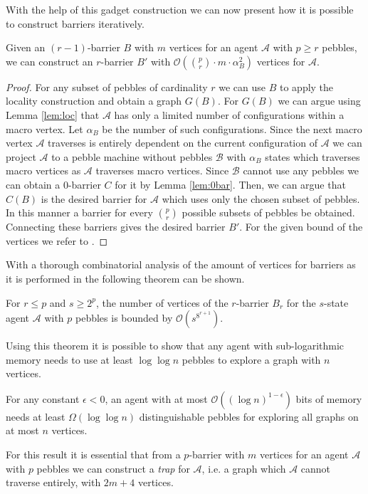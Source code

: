 With the help of this gadget construction we can now present how it is possible
to construct barriers iteratively.
\begin{thm}
  Given an $(r-1)$-barrier $B$ with $m$ vertices for an agent $\mathcal{A}$
  with $p\geq r$ pebbles, we can construct an $r$-barrier $B'$ with
  $\mathcal{O}({{p}\choose{r}}\cdot m\cdot \alpha_{B}^{2})$ vertices for
  $\mathcal{A}$.
\end{thm}
\begin{proof}
  For any subset of pebbles of cardinality $r$ we can use $B$ to apply the
  locality construction and obtain a graph $G(B)$. For $G(B)$ we can argue
  using Lemma \ref{lem:loc} that $\mathcal{A}$ has only a limited
  number of configurations within a macro vertex. Let $\alpha_{B}$ be the
  number of such configurations. Since the next macro vertex $\mathcal{A}$
  traverses is entirely dependent on the current configuration of $\mathcal{A}$
  we can project $\mathcal{A}$ to a pebble machine without pebbles
  $\mathcal{B}$ with $\alpha_{B}$ states which traverses macro vertices as
  $\mathcal{A}$ traverses macro vertices.
  Since $\mathcal{B}$ cannot use any pebbles we can
  obtain a $0$-barrier $C$ for it by Lemma \ref{lem:0bar}. Then, we can argue
  that $C(B)$ is the desired barrier for $\mathcal{A}$ which uses only the
  chosen subset of pebbles. In this manner a barrier for every ${p}\choose{r}$
  possible subsets of pebbles be obtained. Connecting these barriers gives
  the desired barrier $B'$. For the given bound of the vertices we refer to
  \cite{pebbles}.
\end{proof}
With a thorough combinatorial analysis of the amount of vertices for barriers
as it is performed in \cite{pebbles} the following theorem can be shown.
\begin{thm}
  For $r\leq p$ and $s \geq 2^{p}$, the number of vertices of the $r$-barrier
  $B_{r}$ for the $s$-state agent $\mathcal{A}$ with $p$ pebbles is bounded by
  $\mathcal{O}(s^{8^{r+1}})$.
\end{thm}
Using this theorem it is possible to show that any agent with sub-logarithmic
memory needs to use at least $\log\log n$ pebbles to explore a graph with $n$
vertices.
\begin{thm}
  For any constant $\epsilon < 0$, an agent with at most
  $\mathcal{O}((\log n)^{1-\epsilon})$ bits of memory needs at least
  $\Omega(\log\log n)$ distinguishable pebbles for exploring all graphs on at
  most $n$ vertices.
\end{thm}
For this result it is essential that from a $p$-barrier with $m$
vertices for an agent $\mathcal{A}$ with $p$ pebbles we can construct a
\emph{trap} for $\mathcal{A}$, i.e. a graph which $\mathcal{A}$ cannot
traverse entirely, with $2m+4$ vertices.

